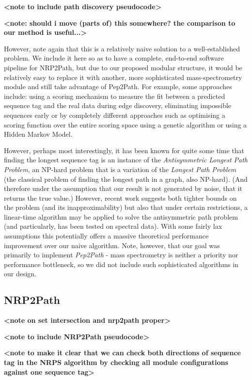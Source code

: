 \documentclass{l4proj}
\newcommand{\cit}[1]{\citep{#1}}
\begin{document}
\textbf{<note to include path discovery pseudocode>}

\textbf{<note: should i move (parts of) this somewhere? the comparison to our method is useful...>}

However, note again that this is a relatively naive solution to a well-established problem. We include it here so as to have a complete, end-to-end software pipeline for NRP2Path, but due to our proposed modular structure, it would be relatively easy to replace it with another, more sophisticated mass-spectrometry module and still take advantage of Pep2Path. For example, some approaches include: using a scoring mechanism to measure the fit between a predicted sequence tag and the real data during edge discovery, eliminating impossible sequences early or by completely different approaches such as optimising a scoring function over the entire scoring space using a genetic algorithm or using a Hidden Markov Model. \cit{protointro}

However, perhaps most interestingly, it has been known for quite some time that finding the longest sequence tag is an instance of the \textit{Antisymmetric Longest Path Problem}, an NP-hard problem that is a variation of the \textit{Longest Path Problem} (the classical problem of finding the longest path in a graph, also NP-hard). \cit{protobook} (And therefore under the assumption that our result is not generated by noise, that it returns the true value.) However, recent work suggests both tighter bounds on the problem (and its inapproximability) \cit{alppbound} but also that under certain restrictions, a linear-time algorithm may be applied to solve the antisymmetric path problem (and particularly, has been tested on spectral data). \cit{alpplinear} With some fairly lax assumptions this potentially offers a massive theoretical performance improvement over our naive algorithm. Note, however, that our goal was primarily to implement \textit{Pep2Path} - mass spectrometry is neither a priority nor performance bottleneck, so we did not include such sophisticated algorithms in our design.

\subsection{NRP2Path}

\textbf{<note on set intersection and nrp2path proper>}

\textbf{<note to include NRP2Path pseudocode>}

\textbf{<note to make it clear that we can check both directions of sequence tag in the NRPS algorithm by checking all module configurations against one sequence tag>}
\end{document}

